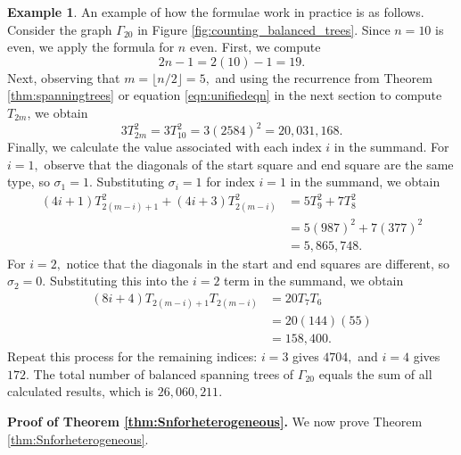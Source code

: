 \documentclass{amsart}
\theoremstyle{definition}
\newtheorem{example}[theorem]{Example}
\newcommand{\yandi}[1]{\marginpar{\tiny \color{red} Yandi: #1}}
\begin{document}
\begin{example}\label{example:balancedspanningtrees} An example of how the formulae work in practice is as follows. Consider the graph $\Gamma_{20}$ in Figure \ref{fig:counting_balanced_trees}. Since $n=10$ is even, we apply the formula for $n$ even. First, we compute
\[2n-1 = 2(10)-1=19.\]
Next, observing that $m=\lfloor n/2 \rfloor = 5,$ and using the recurrence from Theorem \cref{thm:spanningtrees} or equation \ref{eqn:unifiedeqn} in the next section to compute $T_{2m}$, we obtain 
\[3T_{2m}^2=3T_{10}^2=3(2584)^2=20,031,168.\]
Finally, we calculate the value associated with each index $i$ in the summand. For $i=1,$ observe that the diagonals of the start square and end square are the same type, so $\sigma_1=1.$ Substituting $\sigma_i=1$ for index $i=1$ in the summand, we obtain 
\begin{align*}(4i+1)T_{2(m-i)+1}^2 + (4i+3)T_{2(m-i)}^2 &= 5T_{9}^2+7T_8^2
\\ &=5(987)^2+7(377)^2
\\ &=5,865,748.\end{align*}
For $i=2,$ notice that the diagonals in the start and end squares are different, so $\sigma_2=0.$ Substituting this into the $i=2$ term in the summand, we obtain
\begin{align*}
(8i+4)T_{2(m-i)+1}T_{2(m-i)}&=20T_7T_6\\
&=20(144)(55) \\
&=158,400.
\end{align*}
Repeat this process for the remaining indices: $i=3$ gives $4704,$ and $i=4$ gives $172.$ The total number of balanced spanning trees of $\Gamma_{20}$ equals the sum of all calculated results, which is $26,060,211.$

 
\end{example} 

\noindent \textbf{Proof of Theorem \ref{thm:Snforheterogeneous}.} We now prove Theorem \ref{thm:Snforheterogeneous}.
\end{document}
